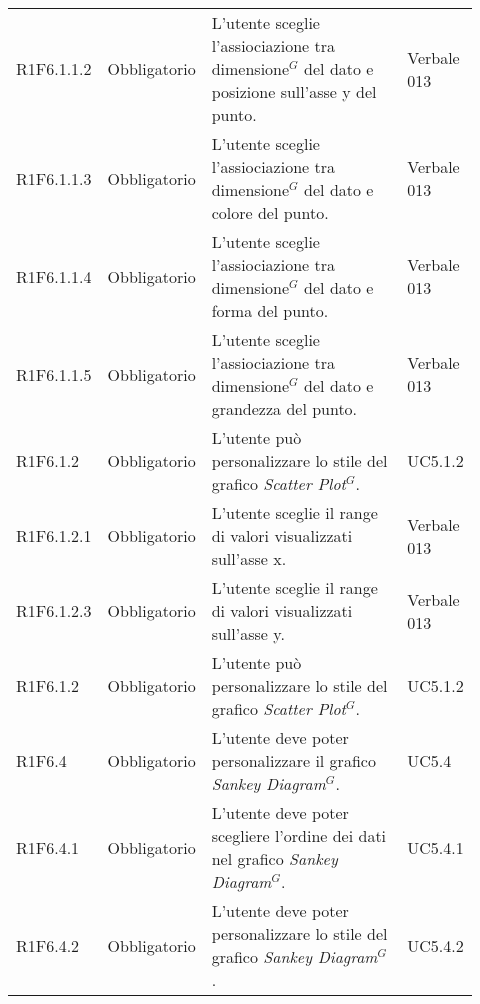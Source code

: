 {\begin{longtable}{p{0.12\linewidth}p{0.15\linewidth}p{0.50\linewidth}p{0.15\linewidth}}
    \rowcolor[RGB]{216, 235, 171}
    R1F6.1.1.2 & Obbligatorio & L'utente sceglie l'assiociazione tra dimensione$^{G}$ del dato e posizione sull'asse y del punto.& Verbale 013\\
    \rowcolor[RGB]{233, 245, 206}
    R1F6.1.1.3 & Obbligatorio & L'utente sceglie l'assiociazione tra dimensione$^{G}$ del dato e colore del punto.& Verbale 013\\
    \rowcolor[RGB]{216, 235, 171}
    R1F6.1.1.4 & Obbligatorio & L'utente sceglie l'assiociazione tra dimensione$^{G}$ del dato e forma del punto.& Verbale 013\\
    \rowcolor[RGB]{233, 245, 206}
    R1F6.1.1.5 & Obbligatorio & L'utente sceglie l'assiociazione tra dimensione$^{G}$ del dato e grandezza del punto.& Verbale 013\\
    \rowcolor[RGB]{216, 235, 171}
    R1F6.1.2 & Obbligatorio & L'utente può personalizzare lo stile del grafico \textit{Scatter Plot$^{G}$}. & UC5.1.2\\
    \rowcolor[RGB]{233, 245, 206}
    R1F6.1.2.1 & Obbligatorio & L'utente sceglie il range di valori visualizzati sull'asse x. & Verbale 013 \\
    \rowcolor[RGB]{216, 235, 171}
    R1F6.1.2.3 & Obbligatorio & L'utente sceglie il range di valori visualizzati sull'asse y. & Verbale 013 \\
    \rowcolor[RGB]{233, 245, 206}
    R1F6.1.2 & Obbligatorio & L'utente può personalizzare lo stile del grafico \textit{Scatter Plot$^{G}$}. & UC5.1.2\\
    \rowcolor[RGB]{233, 245, 206}
    R1F6.4 & Obbligatorio & L'utente deve poter personalizzare il grafico \textit{Sankey Diagram$^{G}$}. & UC5.4\\
    \rowcolor[RGB]{216, 235, 171}
    R1F6.4.1 & Obbligatorio & L'utente deve poter scegliere l'ordine dei dati nel grafico \textit{Sankey Diagram$^{G}$}. & UC5.4.1\\
    \rowcolor[RGB]{233, 245, 206}
    R1F6.4.2 & Obbligatorio & L'utente deve poter personalizzare lo stile del grafico \textit{Sankey Diagram$^{G}$}. & UC5.4.2\\


\end{longtable}}
